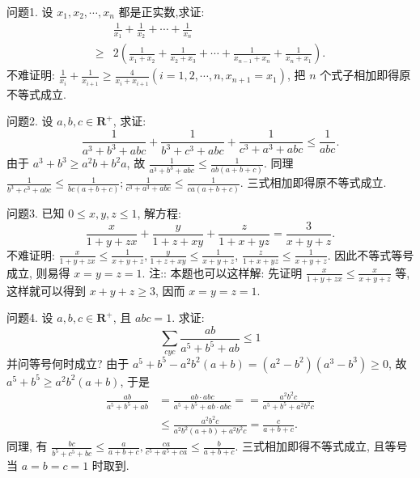 
问题1. 设 $x_1, x_2, \cdots, x_n$ 都是正实数,求证:
$$
\begin{aligned}
& \frac{1}{x_1}+\frac{1}{x_2}+\cdots+\frac{1}{x_n} \\
\geqslant & 2\left(\frac{1}{x_1+x_2}+\frac{1}{x_2+x_3}+\cdots+\frac{1}{x_{n-1}+x_n}+\frac{1}{x_n+x_1}\right) .
\end{aligned}
$$
不难证明: $\frac{1}{x_i}+\frac{1}{x_{i+1}} \geqslant \frac{4}{x_i+x_{i+1}}\left(i=1,2, \cdots, n, x_{n+1}=x_1\right)$, 把 $n$ 个式子相加即得原不等式成立.



问题2. 设 $a, b, c \in \mathbf{R}^{+}$, 求证:
$$
\frac{1}{a^3+b^3+a b c}+\frac{1}{b^3+c^3+a b c}+\frac{1}{c^3+a^3+a b c} \leqslant \frac{1}{a b c} .
$$
由于 $a^3+b^3 \geqslant a^2 b+b^2 a$, 故 $\frac{1}{a^3+b^3+a b c} \leqslant \frac{1}{a b(a+b+c)}$. 同理 $\frac{1}{b^3+c^3+a b c} \leqslant \frac{1}{b c(a+b+c)} ; \frac{1}{c^3+a^3+a b c} \leqslant \frac{1}{c a(a+b+c)}$. 三式相加即得原不等式成立.



问题3. 已知 $0 \leqslant x, y, z \leqslant 1$, 解方程:
$$
\frac{x}{1+y+z x}+\frac{y}{1+z+x y}+\frac{z}{1+x+y z}=\frac{3}{x+y+z} .
$$
不难证明: $\frac{x}{1+y+z x} \leqslant \frac{1}{x+y+z}, \frac{y}{1+z+x y} \leqslant \frac{1}{x+y+z}$,
$\frac{z}{1+x+y z} \leqslant \frac{1}{x+y+z}$. 因此不等式等号成立, 则易得 $x=y=z=1$.
注:: 本题也可以这样解: 先证明 $\frac{x}{1+y+z x} \leqslant \frac{x}{x+y+z}$ 等, 这样就可以得到 $x+y+z \geqslant 3$, 因而 $x=y=z=1$.



问题4. 设 $a, b, c \in \mathbf{R}^{+}$, 且 $a b c=1$. 求证:
$$
\sum_{c y c} \frac{a b}{a^5+b^5+a b} \leqslant 1
$$
并问等号何时成立?
由于 $a^5+b^5-a^2 b^2(a+b)=\left(a^2-b^2\right)\left(a^3-b^3\right) \geqslant 0$, 故 $a^5+b^5 \geqslant a^2 b^2(a+b)$, 于是
$$
\begin{aligned}
\frac{a b}{a^5+b^5+a b} & =\frac{a b \cdot a b c}{a^5+b^5+a b \cdot a b c}==\frac{a^2 b^2 c}{a^5+b^5+a^2 b^2 c} \\
& \leqslant \frac{a^2 b^2 c}{a^2 b^2(a+b)+a^2 b^2 c}=\frac{c}{a+b+c} .
\end{aligned}
$$
同理, 有 $\frac{b c}{b^5+c^5+b c} \leqslant \frac{a}{a+b+c}, \frac{c a}{c^5+a^5+c a} \leqslant \frac{b}{a+b+c}$.
三式相加即得不等式成立, 且等号当 $a=b=c=1$ 时取到.



